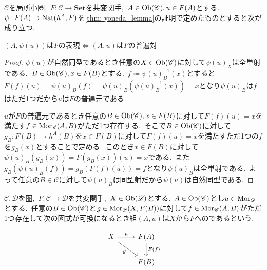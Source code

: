 
\begin{proposition} \label{prop: natural_iso_iff_universal_element}
$\mathscr{C}$を局所小圏,\ $F \colon \mathscr{C} \to \mathbf{Set}$を共変関手,\ $A \in \operatorname{Ob}(\mathscr{C}), u \in F(A)$とする.\
$\psi \colon F(A) \to \operatorname{Nat}(h^A, F)$を\cref{thm: yoneda_lemma}の証明で定めたものとすると次が成り立つ.
\begin{center}
$(A, \psi(u))$は$F$の表現$\iff$$(A, u)$は$F$の普遍対
\end{center}
\end{proposition}

\begin{proof}
	$\psi(u)$が自然同型であるとき任意の$X \in \operatorname{Ob}(\mathscr{C})$に対して$\psi(u)_X$は全単射である.\
$B \in \operatorname{Ob}(\mathscr{C}), x \in F(B)$とする.\
$f \coloneq \psi(u)_B^{-1}(x)$とすると$F(f)(u) = \psi(u)_B(f) = \psi(u)_B(\psi(u)_B^{-1}(x)) = x$となり$\psi(u)_B$は$f$はただ1つだから$u$は$F$の普遍元である.

$u$が$F$の普遍元であるとき任意の$B \in \operatorname{Ob}(\mathscr{C}), x \in F(B)$に対して$F(f)(u) = x$を満たす$f \in \operatorname{Mor}_\mathscr{C}(A, B)$がただ1つ存在する.\
そこで$B \in \operatorname{Ob}(\mathscr{C})$に対して$g_B \colon F(B) \to h^A(B)$を$x \in F(B)$に対して$F(f)(u) = x$を満たすただ1つの$f$を$g_B(x)$とすることで定める.\
このとき$x \in F(B)$に対して$\psi(u)_B(g_B(x)) = F(g_B(x))(u) = x$である.\
また$g_B(\psi(u)_B(f)) = g_B(F(f)(u)) = f$となり$\psi(u)_B$は全単射である.\
よって任意の$B \in \mathscr{C}$に対して$\psi(u)_B$は同型射だから$\psi(u)$は自然同型である.
\end{proof}

\begin{definition} \label{def: IsUniversalMorphism}
$\mathscr{C}, \mathscr{D}$を圏,\ $F \colon \mathscr{C} \to \mathscr{D}$を共変関手,\ $X \in \operatorname{Ob}(\mathscr{D})$とする.\
$A \in \operatorname{Ob}(\mathscr{C})$とし$u \in \operatorname{Mor}_{\mathscr{D}}$とする.\
任意の$B \in \operatorname{Ob}(\mathscr{C})$と$g \in \operatorname{Mor}_{\mathscr{D}}(X, F(B))$に対して$f \in \operatorname{Mor}_{\mathscr{C}}(A,B)$がただ1つ存在して次の図式が可換になるとき組$(A, u)$は$X$から$F$へのであるという.

\[\begin{tikzcd}
	X & {F(A)} \\
	& {F(B)}
	\arrow["u", from=1-1, to=1-2]
	\arrow["g"', from=1-1, to=2-2]
	\arrow["{F(f)}", from=1-2, to=2-2]
\end{tikzcd}\]
\end{definition}

